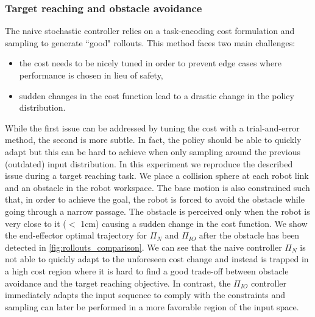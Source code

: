 \subsubsection{Target reaching and obstacle avoidance}
The naive stochastic controller relies on a task-encoding cost formulation and sampling to generate ``good" rollouts. This method faces two main challenges:
\begin{itemize}
    \item the cost needs to be nicely tuned in order to prevent edge cases where performance is chosen in lieu of safety,
    \item sudden changes in the cost function lead to a drastic change in the policy distribution.
\end{itemize}
While the first issue can be addressed by tuning the cost with a trial-and-error method, the second is more subtle. In fact, the policy should be able to quickly adapt but this can be hard to achieve when only sampling around the previous (outdated) input distribution. In this experiment we reproduce the described issue during a target reaching task. We place a collision sphere at each robot link and an obstacle in the robot workspace. The base motion is also constrained such that, in order to achieve the goal, the robot is forced to avoid the obstacle while going through a narrow passage. The obstacle is perceived only when the robot is very close to it ($<$ 1cm) causing a sudden change in the cost function. We show the end-effector optimal trajectory for $\Pi_{N}$ and $\Pi_{IO}$ after the obstacle has been detected in \fig \ref{fig:rollouts_comparison}. We can see that the naive controller $\Pi_{N}$ is not able to quickly adapt to the unforeseen cost change and instead is trapped in a high cost region where it is hard to find a good trade-off between obstacle avoidance and the target reaching objective. In contrast, the $\Pi_{IO}$ controller immediately adapts the input sequence to comply with the constraints and sampling can later be performed in a more favorable region of the input space.    

